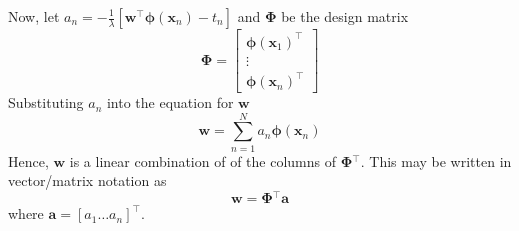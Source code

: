 \documentclass[12pt]{article}
\newcommand{\x}{\mathbf{x}}
\newcommand{\w}{\mathbf{w}}
\newcommand{\aVec}{\mathbf{a}}
\newcommand{\sumN}{\sum \limits_{n=1}^N}
\newcommand{\phiXOne}{\mathbf{\phi}\left(\x{}_1\right)}
\newcommand{\phiXn}{\mathbf{\phi}\left(\x{}_n\right)}
\newcommand{\wTransPhi}{\w{}^\top\phiXn{}}
\newcommand{\PhiMat}{\mathbf{\Phi}}
\begin{document}
%
Now, let $a_n = -\frac{1}{\lambda}\left[\wTransPhi{} - t_n\right]$ and
$\PhiMat{}$
be the design matrix
%
\begin{equation*}
  \PhiMat{} =
  \left[\begin{matrix}
    \phiXOne^\top\\
    \vdots\\
    \phiXn^\top
  \end{matrix}\right]
\end{equation*}
%
Substituting $a_n$ into the equation for $\w{}$
%
\begin{equation*}
  \w{} = \sumN{}a_n\phiXn{}
\end{equation*}
%
Hence, $\w{}$ is a linear combination of of the columns of $\PhiMat{}^\top$.
This may be written in vector/matrix notation as
%
\begin{equation*}
  \w{} = \PhiMat{}^\top\aVec{}
\end{equation*}
%
where $\aVec{} = \left[a_1 \hdots a_n\right]^\top$.
\end{document}
